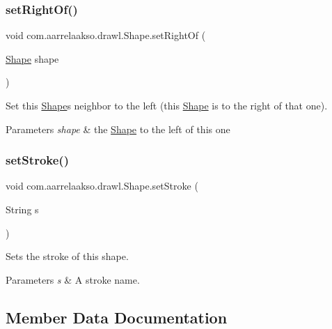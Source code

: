 \subsubsection{\texorpdfstring{set\+Right\+Of()}{setRightOf()}}
{\footnotesize\ttfamily void com.\+aarrelaakso.\+drawl.\+Shape.\+set\+Right\+Of (\begin{DoxyParamCaption}\item[{\hyperlink{classcom_1_1aarrelaakso_1_1drawl_1_1_shape}{Shape}}]{shape }\end{DoxyParamCaption})\hspace{0.3cm}{\ttfamily [inherited]}}

Set this \hyperlink{classcom_1_1aarrelaakso_1_1drawl_1_1_shape}{Shape}\textquotesingle{}s neighbor to the left (this \hyperlink{classcom_1_1aarrelaakso_1_1drawl_1_1_shape}{Shape} is to the right of that one).


\begin{DoxyParams}{Parameters}
{\em shape} & the \hyperlink{classcom_1_1aarrelaakso_1_1drawl_1_1_shape}{Shape} to the left of this one \\
\hline
\end{DoxyParams}
\mbox{\label{classcom_1_1aarrelaakso_1_1drawl_1_1_shape_a3930f6fe72f6c5e0c0aa4c25ffbf18ff}} 
\subsubsection{\texorpdfstring{set\+Stroke()}{setStroke()}}
{\footnotesize\ttfamily void com.\+aarrelaakso.\+drawl.\+Shape.\+set\+Stroke (\begin{DoxyParamCaption}\item[{String}]{s }\end{DoxyParamCaption})\hspace{0.3cm}{\ttfamily [inherited]}}

Sets the stroke of this shape.


\begin{DoxyParams}{Parameters}
{\em s} & A stroke name. \\
\hline
\end{DoxyParams}


\subsection{Member Data Documentation}
\mbox{\label{classcom_1_1aarrelaakso_1_1drawl_1_1_circle_a8e3fa774b3fb8e64c8e1f0381a96df5e}} 
